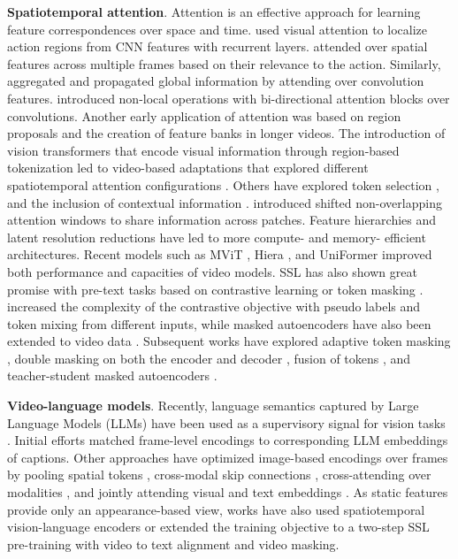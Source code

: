 \noindent
\textbf{Spatiotemporal attention}. Attention is an effective approach for learning feature correspondences over space and time. \citet{sharma2015action} used visual attention to localize action regions from CNN features with recurrent layers. \citet{du2017recurrent} attended over spatial features across multiple frames based on their relevance to the action. Similarly, \citet{chen20182} aggregated and propagated global information by attending over convolution features. \citet{wang2018non} introduced non-local operations with bi-directional attention blocks over convolutions. Another early application of attention \citep{girdhar2019video} was based on region proposals and the creation of feature banks \citep{wu2019long} in longer videos. The introduction of vision transformers \citep{dosovitskiy2020image} that encode visual information through region-based tokenization led to video-based adaptations that explored different spatiotemporal attention configurations \citep{arnab2021vivit,bertasius2021space}. Others have explored token selection \citep{bulat2021space,ryoo2021tokenlearner,zha2021shifted}, and the inclusion of contextual information \citep{kim2021relational}. \citet{liu2022video} introduced shifted non-overlapping attention windows to share information across patches. Feature hierarchies and latent resolution reductions have led to more compute- \citep{fan2021multiscale,li2022mvitv2} and memory- \citep{wu2022memvit} efficient architectures. Recent models such as MViT \citep{yan2022multiview}, Hiera \citep{ryali2023hiera}, and UniFormer \citep{li2022uniformer} improved both performance and capacities of video models. SSL has also shown great promise with pre-text tasks based on contrastive learning \citep{chen2020simple} or token masking \citep{he2022masked}. \citet{xing2023svformer} increased the complexity of the contrastive objective with pseudo labels and token mixing from different inputs, while masked autoencoders have also been extended to video data \citep{feichtenhofer2022masked,wei2022masked}. Subsequent works have explored adaptive token masking \citep{bandara2023adamae}, double masking on both the encoder and decoder \citep{wang2023videomae}, fusion of tokens \citep{kim2024token}, and teacher-student masked autoencoders \citep{wang2023masked}.

\noindent
\textbf{Video-language models}. Recently, language semantics captured by Large Language Models (LLMs) \citep{brown2020language,touvron2023llama} have been used as a supervisory signal for vision tasks \citep{li2023blip,liu2024visual,radford2021learning}. Initial efforts \citep{zellers2021merlot} matched frame-level encodings to corresponding LLM embeddings of captions. Other approaches have optimized image-based encodings over frames by pooling spatial tokens \citep{yu2022coca}, cross-modal skip connections \citep{xu2023mplug}, cross-attending over modalities \citep{alayrac2022flamingo}, and jointly attending visual and text embeddings \citep{maaz2023video}. As static features provide only an appearance-based view, works have also used spatiotemporal vision-language encoders \citep{piergiovanni2024mirasol3b} or extended the training objective \citep{lu2024enhancing,zhao2024videoprism} to a two-step SSL pre-training with video to text alignment and video masking.